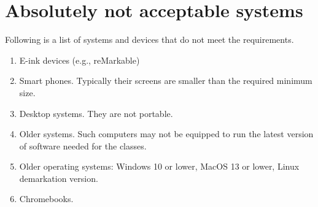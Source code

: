 \section{Absolutely not acceptable systems}

Following is a list of systems and devices that do not meet the requirements.

\begin{enumerate}
    \item E-ink devices (e.g., reMarkable)
    \item Smart phones. Typically their screens are smaller than the required minimum size.
    \item Desktop systems. They are not portable.
    \item Older systems. Such computers may not be equipped to run the latest version of software needed for the classes.
    \item Older operating systems: Windows 10 or lower, MacOS 13 or lower, {\color{red} Linux demarkation version.}
    \item Chromebooks.
\end{enumerate}